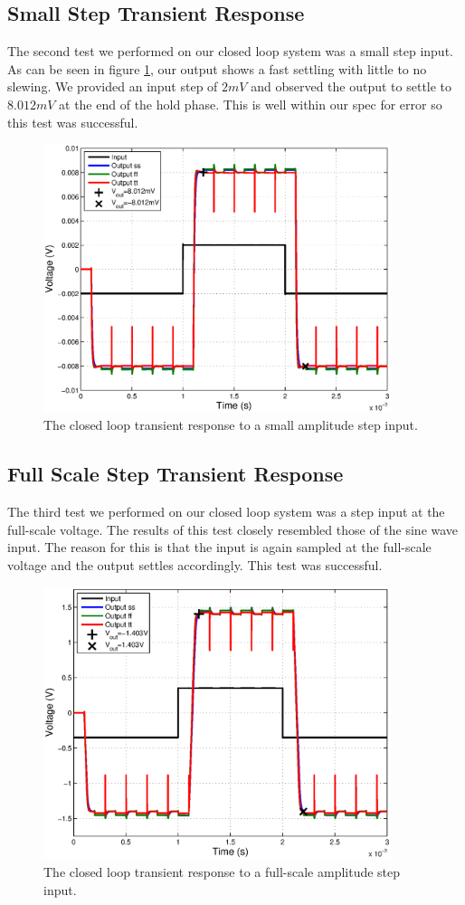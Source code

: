 \documentclass[journal]{IEEEtran}
\begin{document}
\subsection{Small Step Transient Response}
The second test we performed on our closed loop system was a small step input. As can be seen in figure \ref{fig:closed_small_step}, our output shows a fast settling with little to no slewing. We provided an input step of $2mV$ and observed the output to settle to $8.012mV$ at the end of the hold phase. This is well within our spec for error so this test was successful.

\begin{figure}
\centering
\includegraphics[width=4in]{Plots/closed_small_step.eps}
\caption{The closed loop transient response to a small amplitude step input.}
\label{fig:closed_small_step}
\end{figure}


\subsection{Full Scale Step Transient Response}
The third test we performed on our closed loop system was a step input at the full-scale voltage. The results of this test closely resembled those of the sine wave input. The reason for this is that the input is again sampled at the full-scale voltage and the output settles accordingly. This test was successful.

\begin{figure}
\centering
\includegraphics[width=4in]{Plots/closed_large_step.eps}
\caption{The closed loop transient response to a full-scale amplitude step input.}
\label{fig:closed_large_step}
\end{figure}
\end{document}
